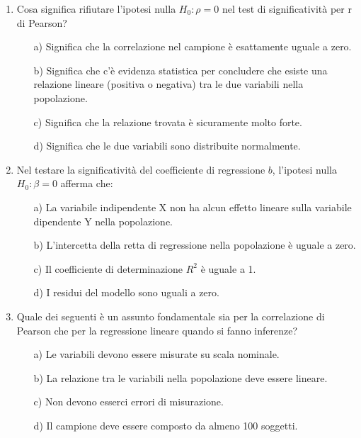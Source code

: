\documentclass[12pt, a4paper]{article}
\newcommand{\rsq}{R^2}
\newcommand{\bcoeff}{b}
\newcommand{\Hnull}{H_0}
\newcommand{\poprho}{\rho}
\newcommand{\popbeta}{\beta}
\begin{document}
\begin{enumerate}
\item  Cosa significa rifiutare l'ipotesi nulla $\Hnull: \poprho = 0$ nel test di significatività per r di Pearson?
\begin{itemize}
    \item[a)] Significa che la correlazione nel campione è esattamente uguale a zero.
    \item[b)] Significa che c'è evidenza statistica per concludere che esiste una relazione lineare (positiva o negativa) tra le due variabili nella popolazione.
    \item[c)] Significa che la relazione trovata è sicuramente molto forte.
    \item[d)] Significa che le due variabili sono distribuite normalmente.
\end{itemize}
\vspace{0.3cm}

\item  Nel testare la significatività del coefficiente di regressione $\bcoeff$, l'ipotesi nulla $\Hnull: \popbeta = 0$ afferma che:
\begin{itemize}
    \item[a)] La variabile indipendente X non ha alcun effetto lineare sulla variabile dipendente Y nella popolazione.
    \item[b)] L'intercetta della retta di regressione nella popolazione è uguale a zero.
    \item[c)] Il coefficiente di determinazione $\rsq$ è uguale a 1.
    \item[d)] I residui del modello sono uguali a zero.
\end{itemize}
\vspace{0.3cm}

\item  Quale dei seguenti è un assunto fondamentale sia per la correlazione di Pearson che per la regressione lineare quando si fanno inferenze?
\begin{itemize}
    \item[a)] Le variabili devono essere misurate su scala nominale.
    \item[b)] La relazione tra le variabili nella popolazione deve essere lineare.
    \item[c)] Non devono esserci errori di misurazione.
    \item[d)] Il campione deve essere composto da almeno 100 soggetti.
\end{itemize}
\vspace{0.3cm}


\end{enumerate}
\end{document}
